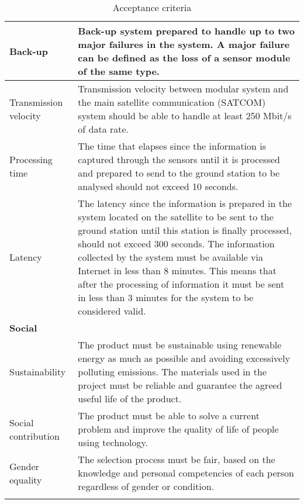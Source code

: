 \begin{longtable}[H]{lp{10.2cm}}
	\midrule	
	Back-up & Back-up system prepared to handle up to two major failures in the system. A major failure can be defined as the loss of a sensor module of the same type.\vspace{0.2cm} \\

	\midrule	
	Transmission velocity & Transmission velocity between modular system and the main satellite communication (SATCOM) system should be able to handle at least 250 Mbit/s of data rate.\vspace{0.2cm} \\

	\midrule	
	Processing time & The time that elapses since the information is captured through the sensors until it is processed and prepared to send to the ground station to be analysed should not exceed 10 seconds.\vspace{0.2cm} \\

	\midrule	
	Latency & The latency since the information is prepared in the system located on the satellite to be sent to the ground station until this station is finally processed, should not exceed 300 seconds. The information collected by the system must be available via Internet in less than 8 minutes. This means that after the processing of information it must be sent in less than 3 minutes for the system to be considered valid.\vspace{0.2cm} \\

	\midrule		
	
	
	\textbf{Social} & \vspace{0.2cm} \\
	
	\midrule
		
	Sustainability & The product must be sustainable using renewable energy as much as possible and avoiding excessively polluting emissions. The materials used in the project must be reliable and guarantee the agreed useful life of the product.\vspace{0.2cm} \\
	
	\midrule		
	
	Social contribution & The product must be able to solve a current problem and improve the quality of life of people using technology.\vspace{0.2cm} \\
	
	\midrule
	
	Gender equality & The selection process must be fair, based on the knowledge and personal competencies of each person regardless of gender or condition.\vspace{0.2cm} \\

	
	\bottomrule[2pt]
	
	\caption{Acceptance criteria}
\end{longtable}